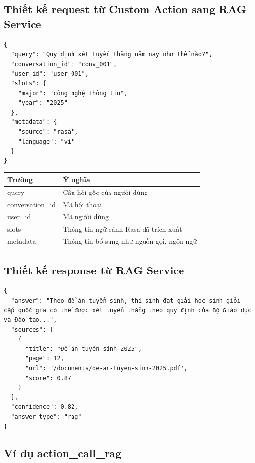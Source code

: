 \subsection*{Thiết kế request từ Custom Action sang RAG Service}

\begin{verbatim}
{
  "query": "Quy định xét tuyển thẳng năm nay như thế nào?",
  "conversation_id": "conv_001",
  "user_id": "user_001",
  "slots": {
    "major": "công nghệ thông tin",
    "year": "2025"
  },
  "metadata": {
    "source": "rasa",
    "language": "vi"
  }
}
\end{verbatim}

\begin{table}[H]
\centering
\begin{tabular}{|l|p{9cm}|}
\hline
\textbf{Trường} & \textbf{Ý nghĩa} \\
\hline
query & Câu hỏi gốc của người dùng \\
\hline
conversation\_id & Mã hội thoại \\
\hline
user\_id & Mã người dùng \\
\hline
slots & Thông tin ngữ cảnh Rasa đã trích xuất \\
\hline
metadata & Thông tin bổ sung như nguồn gọi, ngôn ngữ \\
\hline
\end{tabular}
\end{table}

\subsection*{Thiết kế response từ RAG Service}

\begin{verbatim}
{
  "answer": "Theo đề án tuyển sinh, thí sinh đạt giải học sinh giỏi cấp quốc gia có thể được xét tuyển thẳng theo quy định của Bộ Giáo dục và Đào tạo...",
  "sources": [
    {
      "title": "Đề án tuyển sinh 2025",
      "page": 12,
      "url": "/documents/de-an-tuyen-sinh-2025.pdf",
      "score": 0.87
    }
  ],
  "confidence": 0.82,
  "answer_type": "rag"
}
\end{verbatim}

\subsection*{Ví dụ action\_call\_rag}

